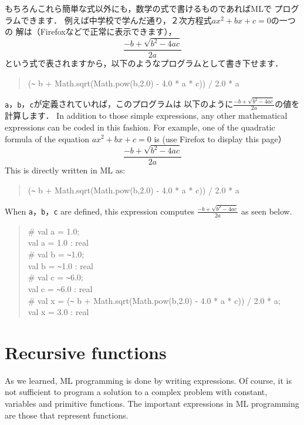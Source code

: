 \documentclass{jbook}
\newcommand{\txt}[2]{#2}
\newenvironment{program}{\begin{tt}\begin{quote}}{\end{quote}\end{tt}}
\begin{document}
\ifx\jp%
	もちろんこれら簡単な式以外にも，数学の式で書けるものであればMLで
プログラムできます．
	例えば中学校で学んだ通り，２次方程式$ax^2 + bx + c = 0$の一つの
解は（Firefoxなどで正常に表示できます），
\[
\frac{ -b + \sqrt{ b^{2} - 4 a c } }{2 a} 
\]
という式で表されますから，以下のようなプログラムとして書き下せます．
\begin{program}
(\verb|~| b + Math.sqrt(Math.pow(b,2.0) - 4.0 * a * c)) / 2.0 * a
\end{program}
	{\tt a}，{\tt b}，{\tt c}が定義されていれば，このプログラムは
以下のように$\frac{ -b + \sqrt{ b^{2} - 4 a c } }{2 a}$の値を計算します．
\else%
	In addition to those simple expressions, any other mathematical
expressions can be coded in this fashion.
	For example, one of the quadratic formula of the equation
$ax^2 + bx + c = 0$ is (use Firefox to display this page）
\[
\frac{ -b + \sqrt{ b^{2} - 4 a c } }{2 a} 
\]
	This is directly written in ML as:
\begin{program}
(\verb|~| b + Math.sqrt(Math.pow(b,2.0) - 4.0 * a * c)) / 2.0 * a
\end{program}
	When {\tt a}，{\tt b}，{\tt c} are defined, this expression
computes $\frac{ -b + \sqrt{ b^{2} - 4 a c } }{2 a}$ as seen below.
\fi%
\begin{program}
\# val a = 1.0;\\
val a = 1.0 : real\\
\# val b = \verb|~|1.0;\\
val b = \verb|~|1.0 : real\\
\# val c = \verb|~|6.0;\\
val c = \verb|~|6.0 : real\\
\# val x = (\verb|~| b + Math.sqrt(Math.pow(b,2.0) - 4.0 * a * c)) / 2.0 * a;\\
val x = 3.0 : real
\end{program}

\section{\txt{再帰的な関数}{Recursive functions}}
\label{sec:tutorialRecursion}
\txt
{
	前節のような定数，変数，組込み関数の組み合わせだけでは，もちろん，
複雑な問題を解くプログラムを記述することはできません．
	MLプログラミングの原則は式を書くことによってプログラムすることで
すが，その中で重要な役割を果たす式が関数を表す式です．
}
{
	As we learned, ML programming is done by writing expressions.
	Of course, it is not sufficient to program a solution to a
complex problem with constant, variables and primitive functions.
	The important expressions in ML programming are those that
represent functions.

}
\end{document}
